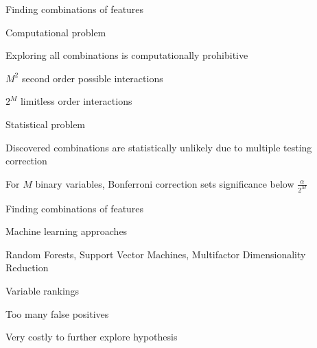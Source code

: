 \documentclass[ignorenonframetext,]{beamer}
\begin{document}
\begin{frame}{Finding combinations of features}

\begin{block}{Computational problem}

Exploring all combinations is computationally prohibitive

\pause

\(M^2\) second order possible interactions

\pause

\(2^M\) limitless order interactions

\pause

\end{block}

\begin{block}{Statistical problem}

Discovered combinations are statistically unlikely due to multiple
testing correction

\pause

For \(M\) binary variables, Bonferroni correction sets significance
below \(\frac{\alpha}{2^M}\)

\end{block}

\end{frame}

\begin{frame}{Finding combinations of features}

\begin{block}{Machine learning approaches}

Random Forests, Support Vector Machines, Multifactor Dimensionality
Reduction

\pause

Variable rankings

\pause

Too many false positives

\pause

Very costly to further explore hypothesis

\end{block}

\end{frame}
\end{document}
